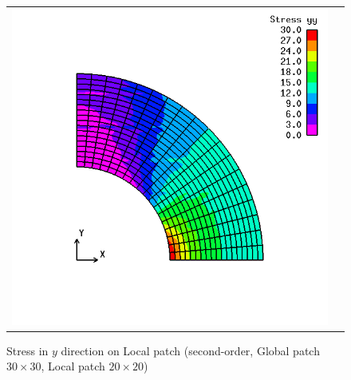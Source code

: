 \begin{figure}[hbtp]
  \begin{tabular}{cc}
    \begin{minipage}[t]{0.45\hsize}
      \centering
      \includegraphics[keepaspectratio, scale=0.3]
      {fig/result_data_etc/s-iga02/contour/2.png}
      \caption{Stress in $y$ direction on Local patch (second-order, Global patch $30\times 30$, Local patch $20\times 20$)}
      \label{fig:s-iga02 y 2}
    \end{minipage} &
    \begin{minipage}[t]{0.45\hsize}
      \centering
      \includegraphics[keepaspectratio, scale=0.3]

\end{minipage}
\end{tabular}
\end{figure}
